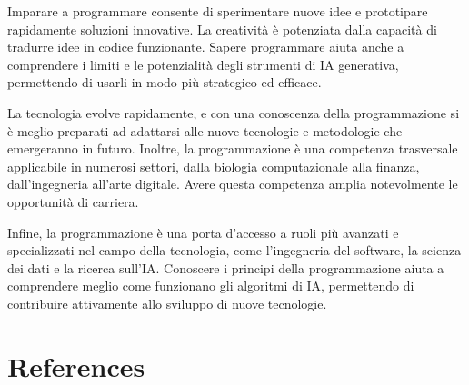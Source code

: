 \documentclass[
  letterpaper,
  DIV=11,
  numbers=noendperiod]{scrreprt}
\newlength{\cslhangindent}
\newenvironment{CSLReferences}[2] %
 {\begin{list}{}{%
  \setlength{\itemindent}{0pt}
  \setlength{\leftmargin}{0pt}
  \setlength{\parsep}{0pt}
  \ifodd #1
   \setlength{\leftmargin}{\cslhangindent}
   \setlength{\itemindent}{-1\cslhangindent}
  \fi
  \setlength{\itemsep}{#2\baselineskip}}}
 {\end{list}}
\begin{document}
Imparare a programmare consente di sperimentare nuove idee e prototipare
rapidamente soluzioni innovative. La creatività è potenziata dalla
capacità di tradurre idee in codice funzionante. Sapere programmare
aiuta anche a comprendere i limiti e le potenzialità degli strumenti di
IA generativa, permettendo di usarli in modo più strategico ed efficace.

La tecnologia evolve rapidamente, e con una conoscenza della
programmazione si è meglio preparati ad adattarsi alle nuove tecnologie
e metodologie che emergeranno in futuro. Inoltre, la programmazione è
una competenza trasversale applicabile in numerosi settori, dalla
biologia computazionale alla finanza, dall'ingegneria all'arte digitale.
Avere questa competenza amplia notevolmente le opportunità di carriera.

Infine, la programmazione è una porta d'accesso a ruoli più avanzati e
specializzati nel campo della tecnologia, come l'ingegneria del
software, la scienza dei dati e la ricerca sull'IA. Conoscere i principi
della programmazione aiuta a comprendere meglio come funzionano gli
algoritmi di IA, permettendo di contribuire attivamente allo sviluppo di
nuove tecnologie.

\cleardoublepage
{}
{}
\appendix

\chapter*{References}\label{references}


\label{refs}
\begin{CSLReferences}{0}{1}
\end{CSLReferences}
\end{document}
